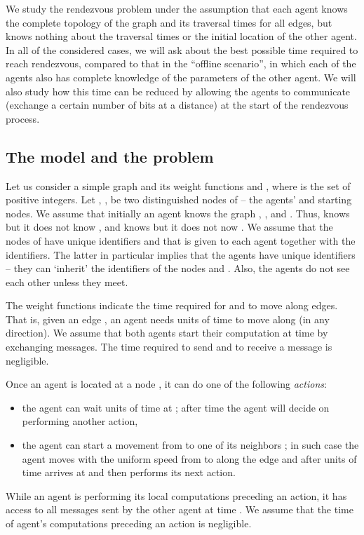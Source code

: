 \documentclass{llncs}
\begin{document}
We study the rendezvous problem under the assumption that each agent knows the complete topology of the graph and its traversal times for all edges, but knows nothing about the traversal times or the initial location of the other agent. In all of the considered cases, 
we will ask about the best possible time required to reach rendezvous, 
compared to that in the ``offline scenario'', in which each of the agents also has complete knowledge of the parameters of the other agent. 
We will also study how this time can be reduced by allowing the agents to communicate (exchange a certain number of bits at a distance) 
at the start of the rendezvous process.
 
\subsection{The model and the problem}

Let us consider a simple graph  and its weight functions  and , where  is the set of positive integers.
Let , , be two distinguished nodes of  -- the agents'  and  starting nodes.
We assume that initially an agent  knows the graph , ,  and .
Thus,  knows  but it does not know , and  knows  but it does not now .
We assume that the nodes of  have unique identifiers and that  is given to each agent together with the identifiers.
The latter in particular implies that the agents have unique identifiers -- they can `inherit' the identifiers of the nodes  and .
Also, the agents do not see each other unless they meet.

The weight functions indicate the time required for  and  to move along edges.
That is, given an edge , an agent  needs  units of time to move along  (in any direction).
We assume that both agents start their computation at time  by exchanging messages. The time required to send and to receive a message is negligible.

Once an agent  is located at a node , it can do one of the following \emph{actions}:
\begin{itemize}
 \item the agent can wait  units of time at ; after time  the agent will decide on performing another action,
 \item the agent can start a movement from  to one of its neighbors ; in such case the agent moves with the uniform speed from  to  along the edge  and after  units of time  arrives at  and then performs its next action.
\end{itemize}
While an agent is performing its local computations preceding an action, it has access to all messages sent by the other agent at time .
We assume that the time of agent's computations preceding an action is negligible.
\end{document}
